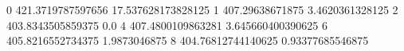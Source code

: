 0 421.3719787597656 17.537628173828125
1 407.29638671875 3.4620361328125
2 403.8343505859375 0.0
4 407.4800109863281 3.645660400390625
6 405.8216552734375 1.9873046875
8 404.76812744140625 0.93377685546875
